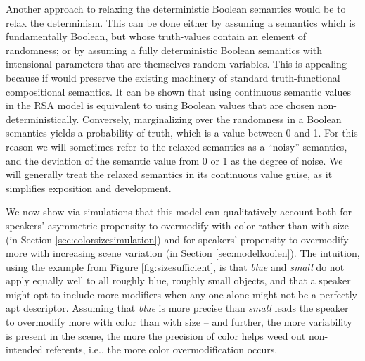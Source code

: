 \documentclass[11pt]{article}
\newcommand{\figref}[1]{Figure \ref{#1}}
\newcommand{\sectionref}[1]{Section \ref{#1}}
\begin{document}
Another approach to relaxing the deterministic Boolean semantics would be to relax the determinism. This can be done either by assuming a semantics which is fundamentally Boolean, but whose truth-values contain an element of randomness; or by assuming a fully deterministic Boolean semantics with intensional parameters that are themselves random variables. This is appealing because if would preserve the existing machinery of standard truth-functional compositional semantics. It can be shown that using continuous semantic values in the RSA model is equivalent to using Boolean values that are chosen non-deterministically. Conversely, marginalizing over the randomness in a Boolean semantics yields a probability of truth, which is a value between 0 and 1. For this reason we will sometimes refer to the relaxed semantics as a ``noisy'' semantics, and the deviation of the semantic value from 0 or 1 as the degree of noise. We will generally treat the relaxed semantics in its continuous value guise, as it simplifies exposition and development.

We now show via simulations that this model can qualitatively account both for speakers' asymmetric propensity to overmodify with color rather than with size (in \sectionref{sec:colorsizesimulation}) and  for speakers' propensity to overmodify more with increasing scene variation (in \sectionref{sec:modelkoolen}). 
The intuition, using the example from \figref{fig:sizesufficient}, is that \emph{blue} and \emph{small} do not apply equally well to all roughly blue, roughly small objects, and that a speaker might opt to include more modifiers when any one alone might not be a perfectly apt descriptor. Assuming that \emph{blue} is more precise than \emph{small} leads the speaker to overmodify more with color than with size -- and further, the more variability is present in the scene, the more the precision of color helps weed out non-intended referents, i.e., the more color overmodification  occurs. 
\end{document}
